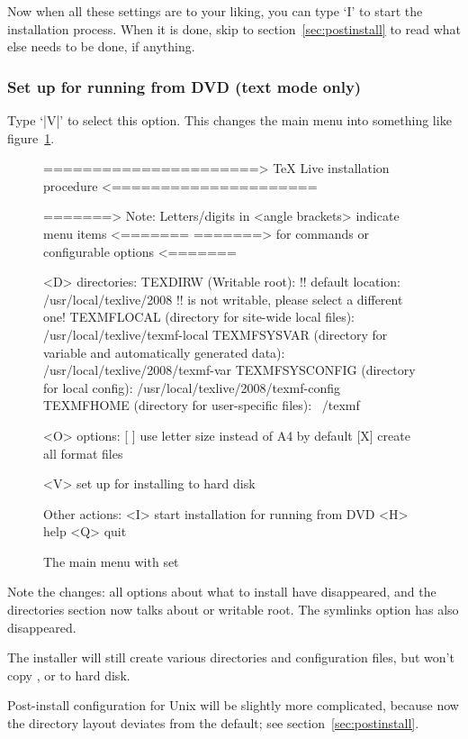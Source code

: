 \documentclass{article}
\begin{document}
Now when all these settings are to your liking, you can type `I' to
start the installation process. When it is done, skip to
section~\ref{sec:postinstall} to read what else needs to be done, if
anything.

\subsubsection{Set up for running from DVD{} (text mode only)}
\label{sec:fromdvd}

Type `|V|' to select this option. This changes the main menu into something
like figure~\ref{fig:main-fromdvd}.
\begin{figure}[tbh]
\begin{boxedverbatim}
======================> TeX Live installation procedure <=====================

=======> Note: Letters/digits in <angle brackets> indicate menu items <=======
=======>       for commands or configurable options                   <=======

 <D> directories:
   TEXDIRW (Writable root):
     !! default location: /usr/local/texlive/2008
     !! is not writable, please select a different one!
   TEXMFLOCAL (directory for site-wide local files):
     /usr/local/texlive/texmf-local
   TEXMFSYSVAR (directory for variable and automatically generated data):
     /usr/local/texlive/2008/texmf-var
   TEXMFSYSCONFIG (directory for local config):
     /usr/local/texlive/2008/texmf-config
   TEXMFHOME (directory for user-specific files):
     ~/texmf

 <O> options:
   [ ] use letter size instead of A4 by default
   [X] create all format files

 <V> set up for installing to hard disk

Other actions:
 <I> start installation for running from DVD
 <H> help
 <Q> quit
\end{boxedverbatim}
\caption{The main menu with 
  set}\label{fig:main-fromdvd}
\end{figure}

Note the changes: all options about what to install have
disappeared, and the directories section now talks about
 or writable root. The symlinks option has also
disappeared.

The installer will still create various directories and
configuration files, but won't copy ,
 or  to hard disk.

Post-install configuration for Unix will be slightly more complicated,
because now the directory layout deviates from the default; see
section~\ref{sec:postinstall}.
\end{document}
